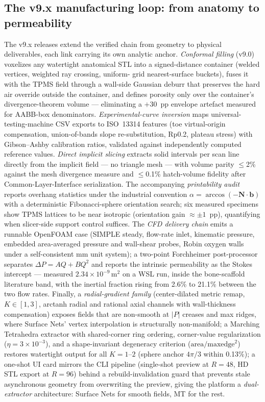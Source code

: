 \documentclass[5p,times,authoryear]{elsarticle}
\begin{document}
\subsection{The v9.x manufacturing loop: from anatomy to permeability}
\label{sec:v91}
The v9.x releases extend the verified chain from geometry to physical deliverables, each link
carrying its own analytic anchor. \emph{Conformal filling} (v9.0) voxelizes any watertight
anatomical STL into a signed-distance container (welded vertices, weighted ray crossing, uniform-
grid nearest-surface buckets), fuses it with the TPMS field through a wall-side Gaussian deburr
that preserves the hard air override outside the container, and defines porosity only over the
container's divergence-theorem volume --- eliminating a $+30$~pp envelope artefact measured for
AABB-box denominators. \emph{Experimental-curve inversion} maps universal-testing-machine CSV
exports to ISO~13314 features (toe virtual-origin compensation, union-of-bands slope re-substitution,
Rp0.2, plateau stress) with Gibson--Ashby calibration ratios, validated against independently
computed reference values. \emph{Direct implicit slicing} extracts solid intervals per scan line
directly from the implicit field --- no triangle mesh --- with volume parity $\le$2\% against the
mesh divergence measure and $\le$0.1\% hatch-volume fidelity after Common-Layer-Interface
serialization. The accompanying \emph{printability audit} reports overhang statistics under the
industrial convention $\alpha=\arccos(-\mathbf{N}\cdot\mathbf{b})$ with a deterministic
Fibonacci-sphere orientation search; six measured specimens show TPMS lattices to be near
isotropic (orientation gain $\approx\pm1$~pp), quantifying when slicer-side support control
suffices. The \emph{CFD delivery chain} emits a runnable OpenFOAM case (SIMPLE steady, flow-rate
inlet, kinematic pressure, embedded area-averaged pressure and wall-shear probes, Robin oxygen
walls under a self-consistent mm unit system); a two-point Forchheimer post-processor separates
$\Delta P=AQ+BQ^2$ and reports the intrinsic permeability as the Stokes intercept --- measured
$2.34\times10^{-9}\,$m$^2$ on a WSL run, inside the bone-scaffold literature band, with the
inertial fraction rising from 2.6\% to 21.1\% between the two flow rates. Finally, a
\emph{radial-gradient family} (center-dilated metric remap, $K\in[1,3]$, arctanh radial and
rational axial channels with wall-thickness compensation) exposes fields that are non-smooth at
$|P|$ creases and max ridges, where Surface Nets' vertex interpolation is structurally
non-manifold; a Marching Tetrahedra extractor with shared-corner ring ordering, corner-value
regularization ($\eta=3\times10^{-3}$), and a shape-invariant degeneracy criterion
($\mathrm{area}/\mathrm{maxedge}^2$) restores watertight output for all $K=1$--$2$ (sphere
anchor $4\pi/3$ within 0.13\%); a one-shot UI card mirrors the CLI pipeline (single-shot
preview at $R{=}48$, HD STL export at $R{=}96$) behind a rebuild-invalidation guard that
prevents stale asynchronous geometry from overwriting the preview, giving the platform a
\emph{dual-extractor} architecture: Surface Nets for smooth fields, MT for the rest.
\end{document}
